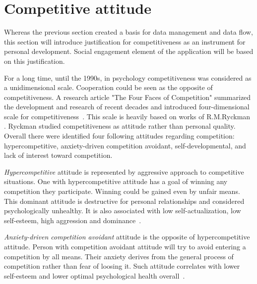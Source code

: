
\section{Competitive attitude}\label{sec:competitive-attitude}



Whereas the previous section created a basis for data management and data flow,
this section will introduce justification for competitiveness as an instrument for personal development.
Social engagement element of the application will be based on this justification.

For a long time, until the 1990s, in psychology competitiveness was considered as a unidimensional scale.
Cooperation could be seen as the opposite of competitiveness.
A research article "The Four Faces of Competition" summarized the development and research of recent decades
and introduced four-dimensional scale for competitiveness~\cite{the-four-faces-of-competetition}.
This scale is heavily based on works of R.M.Ryckman~\cite{cit-ryckman-hca} \cite{cit-ryckman-adca} \cite{cit-ryckman-pdca}.
Ryckman studied competitiveness as attitude rather than personal quality.
Overall there were identified four following attitudes regarding competition:
hypercompetitive, anxiety-driven competition avoidant, self-developmental, and lack of interest toward competition.

\textit{Hypercompetitive} attitude is represented by aggressive approach to competitive situations.
One with hypercompetitive attitude has a goal of winning any competition they participate.
Winning could be gained even by unfair means.
This dominant attitude is destructive for personal relationships and considered psychologically unhealthy.
It is also associated with low self-actualization, low self-esteem, high aggression and dominance~\cite{cit-ryckman-hca}.

\textit{Anxiety-driven competition avoidant} attitude is the opposite of hypercompetitive attitude.
Person with competition avoidant attitude will try to avoid entering a competition by all means.
Their anxiety derives from the general process of competition rather than fear of loosing it.
Such attitude correlates with lower self-esteem and lower optimal psychological health overall~\cite{cit-ryckman-adca}.

